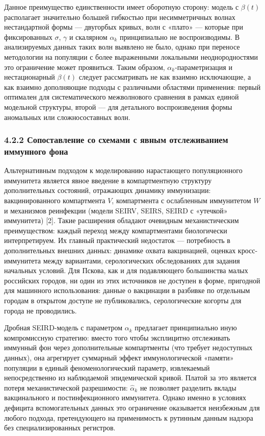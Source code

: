 \documentclass[12pt]{article}
\begin{document}
Данное преимущество единственности имеет оборотную сторону: модель с
\(\beta(t)\) располагает значительно большей гибкостью при
несимметричных волнах нестандартной формы --- двугорбых кривых, волн с
«плато» --- которые при фиксированных \(\sigma\), \(\gamma\) и скалярном
\(\alpha_k\) принципиально не воспроизводимы. В анализируемых данных
таких волн выявлено не было, однако при переносе методологии на
популяции с более выраженными локальными неоднородностями это
ограничение может проявиться. Таким образом, \(\alpha_k\)-параметризация
и нестационарный \(\beta(t)\) следует рассматривать не как взаимно
исключающие, а как взаимно дополняющие подходы с различными областями
применения: первый оптимален для систематического межволнового сравнения
в рамках единой модельной структуры, второй --- для детального
воспроизведения формы аномальных или сложносоставных волн.

\subsubsection{4.2.2 Сопоставление со схемами с явным отслеживанием
иммунного
фона}\label{ux441ux43eux43fux43eux441ux442ux430ux432ux43bux435ux43dux438ux435-ux441ux43e-ux441ux445ux435ux43cux430ux43cux438-ux441-ux44fux432ux43dux44bux43c-ux43eux442ux441ux43bux435ux436ux438ux432ux430ux43dux438ux435ux43c-ux438ux43cux43cux443ux43dux43dux43eux433ux43e-ux444ux43eux43dux430-1}

Альтернативным подходом к моделированию нарастающего популяционного
иммунитета является явное введение в компартментную структуру
дополнительных состояний, отражающих динамику иммунизации:
вакцинированного компартмента \(V\), компартмента с ослабленным
иммунитетом \(W\) и механизмов реинфекции (модели SEIRV, SEIRS, SEIRD с
«утечкой» иммунитета) {[}2{]}. Такие расширения обладают очевидным
механистическим преимуществом: каждый переход между компартментами
биологически интерпретируем. Их главный практический недостаток ---
потребность в дополнительных внешних данных: динамике охвата
вакцинацией, оценках кросс-иммунитета между вариантами, серологических
обследованиях для задания начальных условий. Для Пскова, как и для
подавляющего большинства малых российских городов, ни один из этих
источников не доступен в форме, пригодной для машинного использования:
данные о вакцинации в разбивке по отдельным городам в открытом доступе
не публиковались, серологические когорты для города не проводились.

Дробная SEIRD-модель с параметром \(\alpha_k\) предлагает принципиально
иную компромиссную стратегию: вместо того чтобы эксплицитно отслеживать
иммунный фон через дополнительные компартменты (что требует недоступных
данных), она агрегирует суммарный эффект иммунологической «памяти»
популяции в единый феноменологический параметр, извлекаемый
непосредственно из наблюдаемой эпидемической кривой. Платой за это
является потеря механистической разрешимости: \(\hat{\alpha}_k\) не
позволяет разделить вклады вакцинального и постинфекционного иммунитета.
Однако именно в условиях дефицита вспомогательных данных это ограничение
оказывается неизбежным для любого подхода, претендующего на применимость
к рутинным данным надзора без специализированных регистров.
\end{document}
